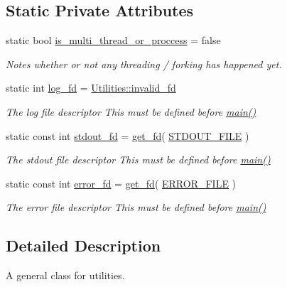 \subsection*{Static Private Attributes}
\begin{DoxyCompactItemize}
\item 
static bool \hyperlink{class_utilities_af893d8dcd5bb1ba3fc72fc108536bcbc}{is\-\_\-multi\-\_\-thread\-\_\-or\-\_\-proccess} = false
\begin{DoxyCompactList}\small\item\em Notes whether or not any threading / forking has happened yet. \end{DoxyCompactList}\item 
static int \hyperlink{class_utilities_ab2b544c3e3a2b34a81703950c52a75a0}{log\-\_\-fd} = \hyperlink{class_utilities_a9633de25a993962a82210f566f2e98d5}{Utilities\-::invalid\-\_\-fd}
\begin{DoxyCompactList}\small\item\em The log file descriptor This must be defined before \hyperlink{shadow__stack_8cpp_a0ddf1224851353fc92bfbff6f499fa97}{main()} \end{DoxyCompactList}\item 
static const int \hyperlink{class_utilities_ac910b642c4a135def84f8cc66a865138}{stdout\-\_\-fd} = \hyperlink{utilities_8cpp_aaae02b49c7ab2526d2c168522390efe3}{get\-\_\-fd}( \hyperlink{constants_8hpp_a195ca3987a60992c5abfc663cd37151d}{S\-T\-D\-O\-U\-T\-\_\-\-F\-I\-L\-E} )
\begin{DoxyCompactList}\small\item\em The stdout file descriptor This must be defined before \hyperlink{shadow__stack_8cpp_a0ddf1224851353fc92bfbff6f499fa97}{main()} \end{DoxyCompactList}\item 
static const int \hyperlink{class_utilities_aeebccd8d584b1660acf867d805f7b07e}{error\-\_\-fd} = \hyperlink{utilities_8cpp_aaae02b49c7ab2526d2c168522390efe3}{get\-\_\-fd}( \hyperlink{constants_8hpp_a9fdff3d78b754d4b831816d0560dbb57}{E\-R\-R\-O\-R\-\_\-\-F\-I\-L\-E} )
\begin{DoxyCompactList}\small\item\em The error file descriptor This must be defined before \hyperlink{shadow__stack_8cpp_a0ddf1224851353fc92bfbff6f499fa97}{main()} \end{DoxyCompactList}\end{DoxyCompactItemize}


\subsection{Detailed Description}
A general class for utilities. 

